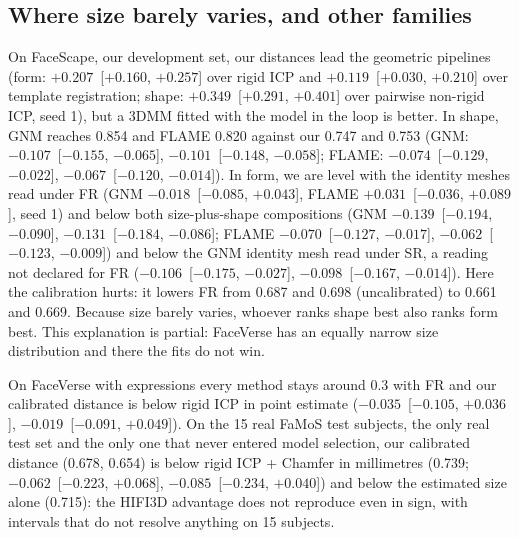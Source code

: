 \documentclass[10pt,twocolumn,letterpaper]{article}
\newcommand{\pd}[3]{$#1$~[$#2$, $#3$]}  %
\begin{document}
\subsection{Where size barely varies, and other families}
\label{sec:other}
On FaceScape, our development set, our distances lead the geometric pipelines (form: \pd{+0.207}{+0.160}{+0.257} over rigid ICP and \pd{+0.119}{+0.030}{+0.210} over template registration; shape: \pd{+0.349}{+0.291}{+0.401} over pairwise non-rigid ICP, seed 1), but a 3DMM fitted with the model in the loop is better. In shape, GNM reaches 0.854 and FLAME 0.820 against our 0.747 and 0.753 (GNM: \pd{-0.107}{-0.155}{-0.065}, \pd{-0.101}{-0.148}{-0.058}; FLAME: \pd{-0.074}{-0.129}{-0.022}, \pd{-0.067}{-0.120}{-0.014}). In form, we are level with the identity meshes read under FR (GNM \pd{-0.018}{-0.085}{+0.043}, FLAME \pd{+0.031}{-0.036}{+0.089}, seed 1) and below both size-plus-shape compositions (GNM \pd{-0.139}{-0.194}{-0.090}, \pd{-0.131}{-0.184}{-0.086}; FLAME \pd{-0.070}{-0.127}{-0.017}, \pd{-0.062}{-0.123}{-0.009}) and below the GNM identity mesh read under SR, a reading not declared for FR (\pd{-0.106}{-0.175}{-0.027}, \pd{-0.098}{-0.167}{-0.014}). Here the calibration hurts: it lowers FR from 0.687 and 0.698 (uncalibrated) to 0.661 and 0.669. Because size barely varies, whoever ranks shape best also ranks form best. This explanation is partial: FaceVerse has an equally narrow size distribution and there the fits do not win.

On FaceVerse with expressions every method stays around 0.3 with FR and our calibrated distance is below rigid ICP in point estimate (\pd{-0.035}{-0.105}{+0.036}, \pd{-0.019}{-0.091}{+0.049}). On the 15 real FaMoS test subjects, the only real test set and the only one that never entered model selection, our calibrated distance (0.678, 0.654) is below rigid ICP + Chamfer in millimetres (0.739; \pd{-0.062}{-0.223}{+0.068}, \pd{-0.085}{-0.234}{+0.040}) and below the estimated size alone (0.715): the HIFI3D advantage does not reproduce even in sign, with intervals that do not resolve anything on 15 subjects.
\end{document}
